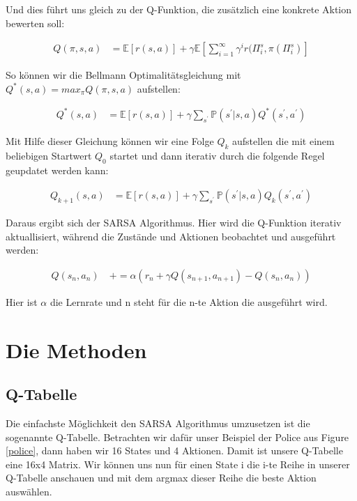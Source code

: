 Und dies führt uns gleich zu der Q-Funktion, die zusätzlich eine konkrete Aktion bewerten soll:

\begin{align}
	Q(\pi, s, a) 	&= \mathbb{E}[r(s,a)] + \gamma \mathbb{E}[\sum\limits_{i=1}^{\infty} \gamma^{i} r(\Pi_{i}^{s},\pi(\Pi_{i}^{s})] 
\end{align}

So können wir die Bellmann Optimalitätsgleichung mit $Q^{*}(s,a) = max_{\pi}Q(\pi,s,a)$ aufstellen:

\begin{align}
	Q^{*}(s, a) 	&= \mathbb{E}[r(s,a)] + \gamma \sum\limits_{s^{\prime}} \mathbb{P}(s^{\prime} | s, a ) Q^{*}(s^{\prime}, a^{\prime})
\end{align}

Mit Hilfe dieser Gleichung können wir eine Folge $Q_k$ aufstellen die mit einem beliebigen Startwert $Q_{0}$ startet und dann iterativ durch die folgende Regel geupdatet werden kann:

\begin{align}
	Q_{k+1}(s, a) &= \mathbb{E}[r(s,a)] + \gamma \sum\limits_{s^{\prime}} \mathbb{P}(s^{\prime} | s, a ) Q_{k}(s^{\prime}, a^{\prime})
\end{align}

Daraus ergibt sich der SARSA Algorithmus. Hier wird die Q-Funktion iterativ aktuallisiert, während die Zustände und Aktionen beobachtet und ausgeführt werden:

\begin{align}
	Q(s_{n}, a_{n}) \: &+= \alpha ( r_n + \gamma Q(s_{n+1}, a_{n+1}) -  Q(s_n, a_n) ) \label{SARSA}
\end{align}

Hier ist $\alpha$ die Lernrate und n steht für die n-te Aktion die ausgeführt wird.

\section{Die Methoden}
\label{sec:methoden}

\subsection{Q-Tabelle}
\label{subsec:Q-Tabelle}

Die einfachste Möglichkeit den SARSA Algorithmus umzusetzen ist die sogenannte Q-Tabelle. Betrachten wir dafür unser Beispiel der Police aus Figure \ref{police}, dann haben wir 16 States und 4 Aktionen. Damit ist unsere Q-Tabelle eine 16x4 Matrix. Wir können uns nun für einen State i die i-te Reihe in unserer Q-Tabelle anschauen und mit dem argmax dieser Reihe die beste Aktion auswählen. \\

